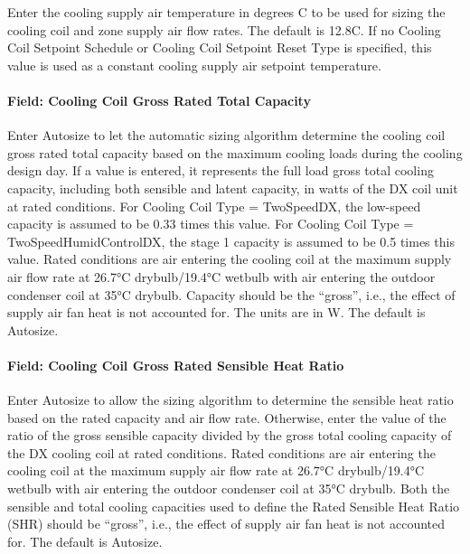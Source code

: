 Enter the cooling supply air temperature in degrees C to be used for sizing the cooling coil and zone supply air flow rates. The default is 12.8C. If no Cooling Coil Setpoint Schedule or Cooling Coil Setpoint Reset Type is specified, this value is used as a constant cooling supply air setpoint temperature.

\paragraph{Field: Cooling Coil Gross Rated Total Capacity}\label{field-cooling-coil-gross-rated-total-capacity-6}

Enter Autosize to let the automatic sizing algorithm determine the cooling coil gross rated total capacity based on the maximum cooling loads during the cooling design day. If a value is entered, it represents the full load gross total cooling capacity, including both sensible and latent capacity, in watts of the DX coil unit at rated conditions. For Cooling Coil Type = TwoSpeedDX, the low-speed capacity is assumed to be 0.33 times this value. For Cooling Coil Type = TwoSpeedHumidControlDX, the stage 1 capacity is assumed to be 0.5 times this value. Rated conditions are air entering the cooling coil at the maximum supply air flow rate at 26.7°C drybulb/19.4°C wetbulb with air entering the outdoor condenser coil at 35°C drybulb. Capacity should be the ``gross'', i.e., the effect of supply air fan heat is not accounted for. The units are in W. The default is Autosize.

\paragraph{Field: Cooling Coil Gross Rated Sensible Heat Ratio}\label{field-cooling-coil-gross-rated-sensible-heat-ratio-6}

Enter Autosize to allow the sizing algorithm to determine the sensible heat ratio based on the rated capacity and air flow rate. Otherwise, enter the value of the ratio of the gross sensible capacity divided by the gross total cooling capacity of the DX cooling coil at rated conditions. Rated conditions are air entering the cooling coil at the maximum supply air flow rate at 26.7°C drybulb/19.4°C wetbulb with air entering the outdoor condenser coil at 35°C drybulb. Both the sensible and total cooling capacities used to define the Rated Sensible Heat Ratio (SHR) should be ``gross'', i.e., the effect of supply air fan heat is not accounted for. The default is Autosize.


